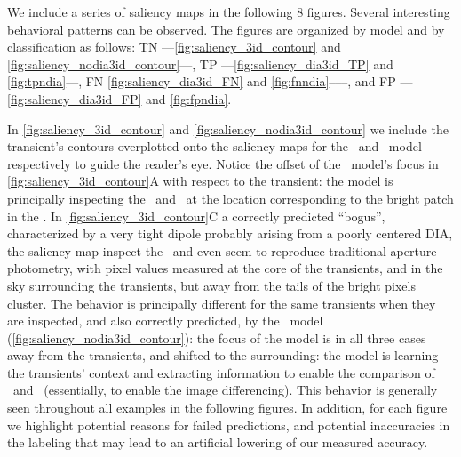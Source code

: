 



We include a series of saliency maps  in the following 8 figures. Several interesting behavioral patterns can be observed. The figures are organized by model and by classification as follows: TN ---\autoref{fig:saliency_3id_contour} and \autoref{fig:saliency_nodia3id_contour}---, TP ---\autoref{fig:saliency_dia3id_TP} and \autoref{fig:tpndia}---, FN \autoref{fig:saliency_dia3id_FN} and \autoref{fig:fnndia}–––, and FP ---\autoref{fig:saliency_dia3id_FP} and \autoref{fig:fpndia}.

In  \autoref{fig:saliency_3id_contour} and \autoref{fig:saliency_nodia3id_contour} we include the transient's contours overplotted onto the saliency maps for the \diabased\ and \nodia\ model respectively to guide the reader's eye. 
Notice the offset of the \diabased\ model's focus in  \autoref{fig:saliency_3id_contour}A with respect to the transient: the model is principally inspecting the \diff\ and \temp\ at the location corresponding to the bright patch in the \diff.
In  \autoref{fig:saliency_3id_contour}C a correctly predicted ``bogus'', characterized by a very tight dipole probably arising from a poorly centered DIA, the saliency map inspect the \temp\ and even seem to reproduce traditional aperture photometry, with pixel values measured at the core of the transients, and in the sky surrounding the transients, but away from the tails of the bright pixels cluster. The behavior is principally different for the same transients when they are inspected, and also correctly predicted, by the \nodia\ model (\autoref{fig:saliency_nodia3id_contour}): the focus of the model is in all three cases away from the transients, and shifted to the surrounding: the model is learning the transients' context and extracting information to enable the comparison of \temp\ and \diff\ (essentially, to enable the image differencing). This behavior is generally seen throughout all examples in the following figures. In addition, for each figure we highlight potential reasons for failed predictions, and potential inaccuracies in the labeling that may lead to an artificial lowering of our measured accuracy.



